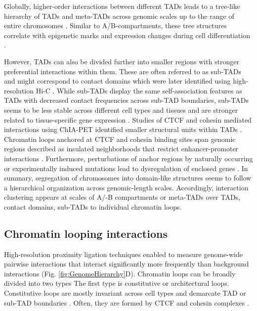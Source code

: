 \documentclass[a4paper,twoside=true,openright,parskip=full,chapterprefix=true,11pt,headings=normal,bibliography=totoc,listof=totoc,titlepage=on,captions=tableabove,draft=false]{scrreprt}
\theoremstyle{definition}
\theoremstyle{definition}
\theoremstyle{definition}
\theoremstyle{remark}
\begin{document}
Globally, higher-order interactions between different TADs leads to a
tree-like hierarchy of TADs and meta-TADs across genomic scales up to
the range of entire chromosomes \citep{Fraser2015}. Similar to
A/B-compartments, these tree structures correlate with epigenetic marks
and expression changes during cell differentiation \citep{Fraser2015}.

However, TADs can also be divided further into smaller regions with
stronger preferential interactions within them. These are often referred
to as sub-TADs \citep{Phillips-Cremins2013} and might correspond to
contact domains which were later identified using high-resolution Hi-C
\citep{Rao2014}. While sub-TADs display the same self-association
features as TADs with decreased contact frequencies across sub-TAD
boundaries, sub-TADs seems to be less stable across different cell types
and tissues and are stronger related to tissue-specific gene expression
\citep{Berlivet2013, Phillips-Cremins2013}. Studies of CTCF and cohesin
mediated interactions using ChIA-PET identified smaller structural units
within TADs \citep{Dowen2014}. Chromatin loops anchored at CTCF and
cohesin binding sites span genomic regions described as insulated
neighborhoods that restrict enhancer-promoter interactions
\citep{Hnisz2016a}. Furthermore, perturbations of anchor regions by
naturally occurring or experimentally induced mutations lead to
dysregulation of enclosed genes \citep{Dowen2014, Hnisz2016, Ji2016}. In
summary, segregation of chromosomes into domain-like structures seems to
follow a hierarchical organization across genomic-length scales.
Accordingly, interaction clustering appears at scales of A/-B
compartments or meta-TADs over TADs, contact domains, sub-TADs to
individual chromatin loops.

\hypertarget{chromatin-looping-interactions}{%
\subsection{Chromatin looping
interactions}\label{chromatin-looping-interactions}}

High-resolution proximity ligation techniques enabled to measure
genome-wide pairwise interactions that interact significantly more
frequently than background interactions (Fig.
\ref{fig:GenomeHierarchy}D). Chromatin loops can be broadly divided into
two types \citep{Yu2017, Andrey2017} The first type is constitutive or
architectural loops. Constitutive loops are mostly invariant across cell
types and demarcate TAD or sub-TAD boundaries
\citep{Dowen2014, Ji2016, Phillips-Cremins2013}. Often, they are formed
by CTCF and cohesin complexes \citep{Rao2014}.
\end{document}
